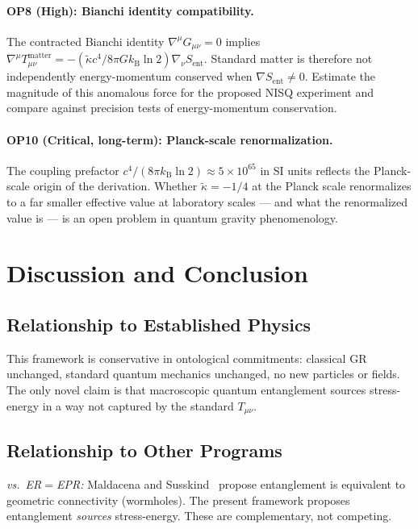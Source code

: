 \documentclass[12pt,letterpaper]{article}
\theoremstyle{plain}
\theoremstyle{definition}
\theoremstyle{remark}
\newcommand{\kB}{k_{\mathrm{B}}}
\newcommand{\lnTwo}{\ln 2}
\newcommand{\kt}{\tilde{\kappa}}
\newcommand{\Sent}{S_{\mathrm{ent}}}
\begin{document}
\paragraph{OP8 (High): Bianchi identity compatibility.}
The contracted Bianchi identity $\nabla^{\mu}G_{\mu\nu} = 0$ implies
$\nabla^{\mu}T_{\mu\nu}^{\mathrm{matter}} = -(\kt c^{4}/8\pi G\kB\lnTwo)\nabla_{\nu}\Sent$.
Standard matter is therefore not independently energy-momentum conserved when $\nabla\Sent
\neq 0$.  Estimate the magnitude of this anomalous force for the proposed NISQ experiment and
compare against precision tests of energy-momentum conservation.

\paragraph{OP10 (Critical, long-term): Planck-scale renormalization.}
The coupling prefactor $c^{4}/(8\pi\kB\lnTwo) \approx 5\times10^{65}$ in SI units reflects
the Planck-scale origin of the derivation.  Whether $\kt = -1/4$ at the Planck scale
renormalizes to a far smaller effective value at laboratory scales --- and what the
renormalized value is --- is an open problem in quantum gravity phenomenology.

\section{Discussion and Conclusion}
\label{sec:conclusion}

\subsection{Relationship to Established Physics}

This framework is conservative in ontological commitments: classical GR unchanged, standard
quantum mechanics unchanged, no new particles or fields.  The only novel claim is that
macroscopic quantum entanglement sources stress-energy in a way not captured by the standard
$T_{\mu\nu}$.

\subsection{Relationship to Other Programs}

\emph{vs.\ ER$=$EPR:} Maldacena and Susskind~\cite{Maldacena2013} propose entanglement is
equivalent to geometric connectivity (wormholes).  The present framework proposes entanglement
\emph{sources} stress-energy.  These are complementary, not competing.
\end{document}
